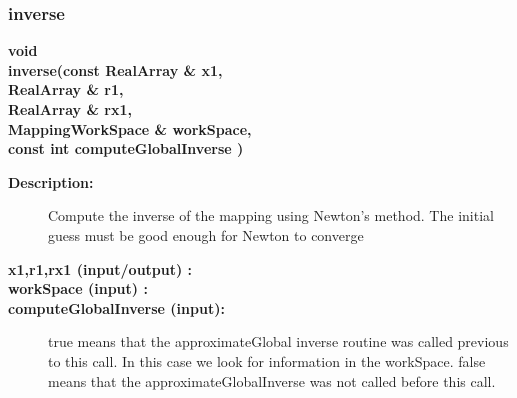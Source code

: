 \subsubsection{inverse}
 
\begin{flushleft} \textbf{%
void  \\ 
\settowidth{\ExactLocalInverseIncludeArgIndent}{inverse(}%
inverse(const RealArray \& x1, \\ 
\hspace{\ExactLocalInverseIncludeArgIndent}RealArray \& r1, \\ 
\hspace{\ExactLocalInverseIncludeArgIndent}RealArray \& rx1, \\ 
\hspace{\ExactLocalInverseIncludeArgIndent}MappingWorkSpace \& workSpace,\\ 
\hspace{\ExactLocalInverseIncludeArgIndent}const int computeGlobalInverse )
}\end{flushleft}
\begin{description}
\item[{\bf Description:}] 
   Compute the inverse of the mapping using Newton's method.
   The initial guess must be good enough for Newton to converge

\item[{\bf x1,r1,rx1 (input/output) :}]  
\item[{\bf workSpace (input) :}] 
\item[{\bf computeGlobalInverse (input):}]  
     true means that the approximateGlobal inverse routine was called previous
     to this call. In this case we look for information in the workSpace.
     false means that the approximateGlobalInverse was not called before this
     call.
\end{description}
